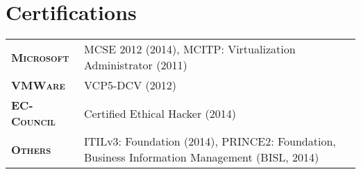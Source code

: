 \section{Certifications}
\begin{tabularx}{\linewidth}{>{\raggedleft\scshape}p{2.5cm}X}
\textbf{Microsoft} & MCSE 2012 (2014), MCITP: Virtualization Administrator (2011)\\
\textbf{VMWare} & VCP5-DCV (2012)\\
\textbf{EC-Council} & Certified Ethical Hacker (2014)\\
\textbf{Others} & ITILv3: Foundation (2014), PRINCE2: Foundation, Business Information Management (BISL, 2014)\\
\end{tabularx}